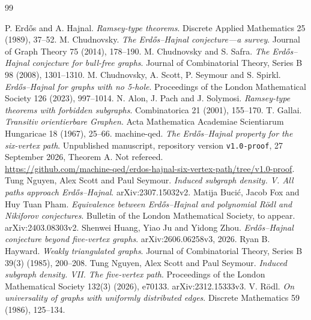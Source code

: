 \documentclass[11pt,a4paper]{article}
\theoremstyle{definition}
\theoremstyle{remark}
\numberwithin{equation}{section}
\begin{document}
\begin{thebibliography}{99}\small\raggedright
{} P. Erd\H{o}s and A. Hajnal. \emph{Ramsey-type theorems}. Discrete Applied Mathematics 25 (1989), 37--52.
 M. Chudnovsky. \emph{The Erd\H{o}s--Hajnal conjecture---a survey}. Journal of Graph Theory 75 (2014), 178--190.
 M. Chudnovsky and S. Safra. \emph{The Erd\H{o}s--Hajnal conjecture for bull-free graphs}. Journal of Combinatorial Theory, Series B 98 (2008), 1301--1310.
 M. Chudnovsky, A. Scott, P. Seymour and S. Spirkl. \emph{Erd\H{o}s--Hajnal for graphs with no 5-hole}. Proceedings of the London Mathematical Society 126 (2023), 997--1014.
 N. Alon, J. Pach and J. Solymosi. \emph{Ramsey-type theorems with forbidden subgraphs}. Combinatorica 21 (2001), 155--170.
 T. Gallai. \emph{Transitiv orientierbare Graphen}. Acta Mathematica Academiae Scientiarum Hungaricae 18 (1967), 25--66.
 machine-qed. \emph{The Erd\H{o}s--Hajnal property for the six-vertex path}. Unpublished manuscript, repository version \texttt{v1.0-proof}, 27 September 2026, Theorem A. Not refereed.\\ \url{https://github.com/machine-qed/erdos-hajnal-six-vertex-path/tree/v1.0-proof}.
 Tung Nguyen, Alex Scott and Paul Seymour. \emph{Induced subgraph density. V. All paths approach Erd\H{o}s--Hajnal}. arXiv:2307.15032v2.
 Matija Buci\'c, Jacob Fox and Huy Tuan Pham. \emph{Equivalence between Erd\H{o}s--Hajnal and polynomial R\"odl and Nikiforov conjectures}. Bulletin of the London Mathematical Society, to appear. arXiv:2403.08303v2.
 Shenwei Huang, Yiao Ju and Yidong Zhou. \emph{Erd\H{o}s--Hajnal conjecture beyond five-vertex graphs}. arXiv:2606.06258v3, 2026.
 Ryan B. Hayward. \emph{Weakly triangulated graphs}. Journal of Combinatorial Theory, Series B 39(3) (1985), 200--208.
 Tung Nguyen, Alex Scott and Paul Seymour. \emph{Induced subgraph density. VII. The five-vertex path}. Proceedings of the London Mathematical Society 132(3) (2026), e70133. arXiv:2312.15333v3.
 V. R\"odl. \emph{On universality of graphs with uniformly distributed edges}. Discrete Mathematics 59 (1986), 125--134.
\end{thebibliography}
\end{document}
